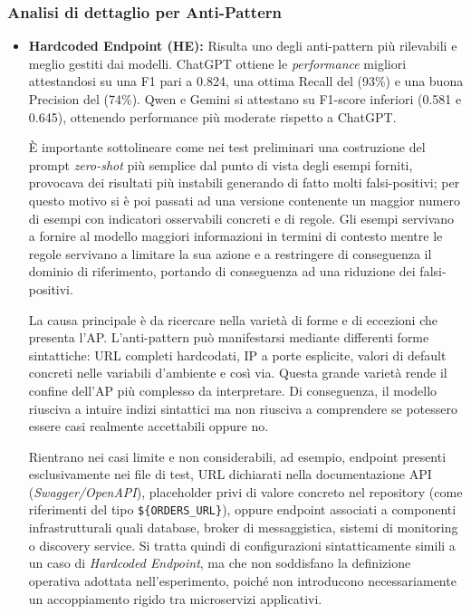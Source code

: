 \subsubsection*{Analisi di dettaglio per Anti-Pattern}

\begin{itemize}
    
    \item \textbf{Hardcoded Endpoint (HE):} Risulta uno degli anti-pattern più rilevabili e meglio gestiti dai modelli. ChatGPT ottiene le \textit{performance} migliori attestandosi su una F1 pari a 0.824, una ottima Recall del (93\%) e una buona Precision del (74\%). Qwen e Gemini si attestano su F1-score inferiori (0.581 e 0.645), ottenendo performance più moderate rispetto a ChatGPT.

    È importante sottolineare come nei test preliminari una costruzione del prompt \textit{zero-shot} più semplice dal punto di vista degli esempi forniti, provocava dei risultati più instabili generando di fatto molti falsi-positivi; per questo motivo si è poi passati ad una versione contenente un maggior numero di esempi con indicatori osservabili concreti e di regole. 
    Gli esempi servivano a fornire al modello maggiori informazioni in termini di contesto mentre le regole servivano a limitare la sua azione e a restringere di conseguenza il dominio di riferimento, portando di conseguenza ad una riduzione dei falsi-positivi.

    La causa principale è da ricercare nella varietà di forme e di eccezioni che presenta l'AP. L'anti-pattern può manifestarsi mediante differenti forme sintattiche: URL completi hardcodati, IP a porte esplicite, valori di default concreti nelle variabili d'ambiente e così via. Questa grande varietà rende il confine dell'AP più complesso da interpretare. Di conseguenza, il modello riusciva a intuire indizi sintattici ma non riusciva a comprendere se potessero essere casi realmente accettabili oppure no.
    
    Rientrano nei casi limite e non considerabili, ad esempio, endpoint presenti esclusivamente nei file di test, URL dichiarati nella documentazione API (\textit{Swagger/OpenAPI}), placeholder privi di valore concreto nel repository (come riferimenti del tipo \texttt{\$\{ORDERS\_URL\}}), oppure endpoint associati a componenti infrastrutturali quali database, broker di messaggistica, sistemi di monitoring o discovery service. Si tratta quindi di configurazioni sintatticamente simili a un caso di \textit{Hardcoded Endpoint}, ma che non soddisfano la definizione operativa adottata nell'esperimento, poiché non introducono necessariamente un accoppiamento rigido tra microservizi applicativi.


\end{itemize}
